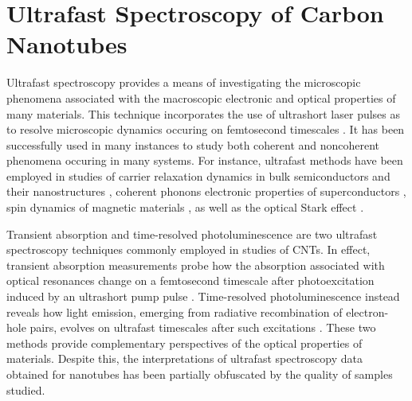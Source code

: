 \section{Ultrafast Spectroscopy of Carbon Nanotubes}

Ultrafast spectroscopy provides a means of investigating the microscopic phenomena associated with the macroscopic electronic and optical properties of many materials. This technique incorporates the use of ultrashort laser pulses as to resolve microscopic dynamics occuring on femtosecond timescales \cite{shah1996ultrafast}. It has been successfully used in many instances to study both coherent and noncoherent phenomena occuring in many systems. For instance, ultrafast methods have been employed in studies of carrier relaxation dynamics in bulk semiconductors \cite{beard2000transient, hendry2007exciton, pijpers2009assessment} and their nanostructures \cite{johar2019ultrafast, zhang1997ultrafast, hopper2018ultrafast}, coherent phonons \cite{farztdinov1997spectral, melnikov2018coherent} electronic properties of superconductors \cite{zhang2016stimulated, kaindl2005dynamics, mankowsky2014nonlinear}, spin dynamics of magnetic materials \cite{beaurepaire1996ultrafast, kirilyuk2010ultrafast, kim2016ultrafast}, as well as the optical Stark effect \cite{von1986optical, frohlich1985observation, sie2015valley}.

Transient absorption and time-resolved photoluminescence are two ultrafast spectroscopy techniques commonly employed in studies of CNTs. In effect, transient absorption measurements probe how the absorption associated with optical resonances change on a femtosecond timescale after photoexcitation induced by an ultrashort pump pulse \cite{shah1996ultrafast}. Time-resolved photoluminescence instead reveals how light emission, emerging from radiative recombination of electron-hole pairs, evolves on ultrafast timescales after such excitations \cite{shah1996ultrafast}. These two methods provide complementary perspectives of the optical properties of materials. Despite this, the interpretations of ultrafast spectroscopy data obtained for nanotubes has been partially obfuscated by the quality of samples studied.


